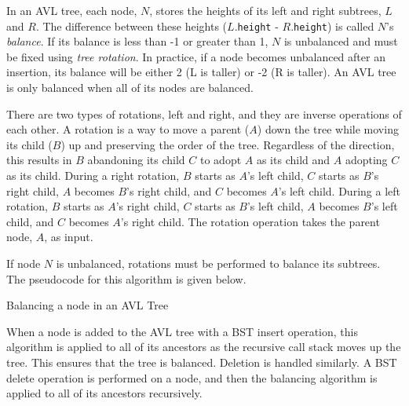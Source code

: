 In an AVL tree, each node, $N$, stores the heights of its left and right subtrees, $L$ and $R$. The difference between these heights ($L$.\texttt{height} - $R$.\texttt{height}) is called $N$'s \textit{balance}. If its balance is less than -1 or greater than 1, $N$ is unbalanced and must be fixed using \textit{tree rotation}. In practice, if a node becomes unbalanced after an insertion, its balance will be either 2 (L is taller) or -2 (R is taller). An AVL tree is only balanced when all of its nodes are balanced.

There are two types of rotations, left and right, and they are inverse operations of each other. A rotation is a way to move a parent ($A$) down the tree while moving its child ($B$) up and preserving the order of the tree. Regardless of the direction, this results in $B$ abandoning its child $C$ to adopt $A$ as its child and $A$ adopting $C$ as its child. During a right rotation, $B$ starts as $A$'s left child, $C$ starts as $B$'s right child, $A$ becomes $B$'s right child, and $C$ becomes $A$'s left child. During a left rotation, $B$ starts as $A$'s right child, $C$ starts as $B$'s left child, $A$ becomes $B$'s left child, and $C$ becomes $A$'s right child. The rotation operation takes the parent node, $A$, as input.

If node $N$ is unbalanced, rotations must be performed to balance its subtrees. The pseudocode for this algorithm is given below.

\vspace{4mm}
\begin{algorithm}[H]
    \caption{Balancing a node in an AVL Tree}
\end{algorithm}
\vspace{5mm}

When a node is added to the AVL tree with a BST insert operation, this algorithm is applied to all of its ancestors as the recursive call stack moves up the tree. This ensures that the tree is balanced. Deletion is handled similarly. A BST delete operation is performed on a node, and then the balancing algorithm is applied to all of its ancestors recursively.

